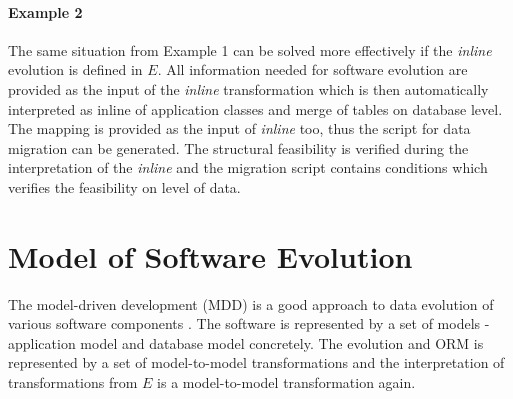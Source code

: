 \documentclass[runningheads]{comsis}
\begin{document}
\paragraph{Example 2} The same situation from Example 1 can be solved more effectively if the \emph{inline} evolution is defined in $E$. All information needed for software evolution are provided as the input of the \emph{inline} transformation which is then automatically interpreted as inline of application classes and merge of tables on database level. The mapping is provided as the input of \emph{inline} too, thus the script for data migration can be generated. The structural feasibility is verified during the interpretation of the \emph{inline} and the migration script contains conditions which verifies the feasibility on level of data.





\section{Model of Software Evolution}
\label{sec:models}
The model-driven development (MDD) is a good approach to data evolution of various software components \cite{Moravec:PracticalApproach}. The software is represented by a set of models - application model and database model concretely. The evolution and ORM is represented by a set of model-to-model transformations and the interpretation of transformations from $E$ is a model-to-model transformation again. 
\end{document}
